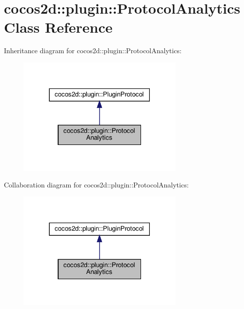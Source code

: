\hypertarget{classcocos2d_1_1plugin_1_1ProtocolAnalytics}{}\section{cocos2d\+:\+:plugin\+:\+:Protocol\+Analytics Class Reference}
\label{classcocos2d_1_1plugin_1_1ProtocolAnalytics}


Inheritance diagram for cocos2d\+:\+:plugin\+:\+:Protocol\+Analytics\+:
\nopagebreak
\begin{figure}[H]
\begin{center}
\leavevmode
\includegraphics[width=234pt]{classcocos2d_1_1plugin_1_1ProtocolAnalytics__inherit__graph}
\end{center}
\end{figure}


Collaboration diagram for cocos2d\+:\+:plugin\+:\+:Protocol\+Analytics\+:
\nopagebreak
\begin{figure}[H]
\begin{center}
\leavevmode
\includegraphics[width=234pt]{classcocos2d_1_1plugin_1_1ProtocolAnalytics__coll__graph}
\end{center}
\end{figure}
